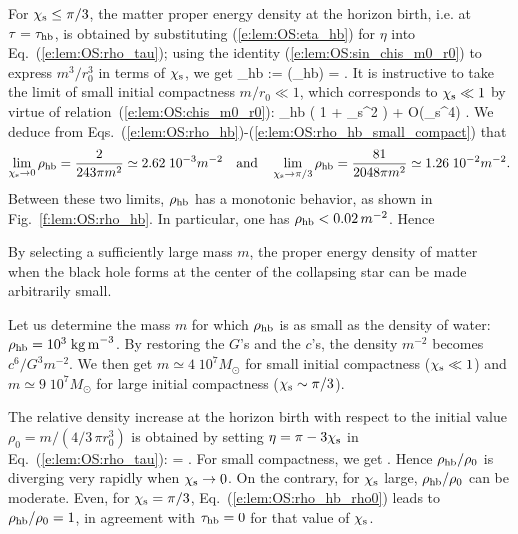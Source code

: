For $\chi_{\rm s} \leq \pi/3$, the matter proper energy density at the horizon birth,
i.e. at $\tau = \tau_{\rm hb}$, is obtained by substituting (\ref{e:lem:OS:eta_hb})
for $\eta$ into Eq.~(\ref{e:lem:OS:rho_tau}); using the identity (\ref{e:lem:OS:sin_chis_m0_r0})
to express $m^3/r_0^3$ in terms of $\chi_{\rm s}$, we get
\be \label{e:lem:OS:rho_hb}
    \rho_{\rm hb} := \rho(\tau_{\rm hb}) =   .
\ee
It is instructive to take the limit of small initial compactness $m/r_0 \ll 1$,
which corresponds to $\chi_{\rm s} \ll 1$ by virtue of relation~(\ref{e:lem:OS:chis_m0_r0}):
\be \label{e:lem:OS:rho_hb_small_compact}
    \rho_{\rm hb}\simeq {} \left( 1 +  \chi_{\rm s}^2 \right)
    + O(\chi_{\rm s}^4) .
\ee
We deduce from Eqs.~(\ref{e:lem:OS:rho_hb})-(\ref{e:lem:OS:rho_hb_small_compact}) that
\[
    \lim_{\chi_{\rm s}\to 0} \rho_{\rm hb} = \frac{2}{243\pi m^2}
    \simeq 2.62\; 10^{-3} m^{-2}
    \quad\mbox{and}\quad
    \lim_{\chi_{\rm s}\to \pi/3}  \rho_{\rm hb} = \frac{81}{2048\pi m^2}
    \simeq 1.26\; 10^{-2}  m^{-2}.
\]
Between these two limits, $\rho_{\rm hb}$ has a monotonic behavior, as shown in
Fig.~\ref{f:lem:OS:rho_hb}. In particular, one has
$\rho_{\rm hb} < 0.02 \, m^{-2}$.
Hence
\begin{prop}
By selecting a sufficiently large mass $m$, the proper energy density
of matter when the black hole forms at the center of the collapsing star
can be made arbitrarily small.
\end{prop}
\begin{example} \label{x:lem:OS:rho_hb_water}
Let us determine the mass $m$ for which  $\rho_{\rm hb}$ is as small as
the density of water: $\rho_{\rm hb} = 10^3 \; {\rm kg\, m}^{-3}$.
By restoring the $G$'s and the $c$'s, the density $m^{-2}$ becomes
$c^6/G^3 m^{-2}$.  We then get $m \simeq 4\; 10^7 M_\odot$ for small initial compactness
($\chi_{\rm s} \ll 1$)
and $m \simeq 9\; 10^7 M_\odot$ for large initial compactness
($\chi_{\rm s} \sim \pi/3$).
\end{example}

The relative density increase at the horizon birth with respect to the initial
value $\rho_0 = m/(4/3 \,\pi r_0^3)$ is obtained by setting $\eta = \pi - 3 \chi_{\rm s}$
in Eq.~(\ref{e:lem:OS:rho_tau}):
\be \label{e:lem:OS:rho_hb_rho0}
     =  .
\ee
For small compactness, we get
\be \label{e:lem:OS:rho_hb_rho0_small_chis}
       .
\ee
Hence $\rho_{\rm hb}/\rho_0$ is diverging very rapidly when $\chi_{\rm s}\to 0$.
On the contrary, for $\chi_{\rm s}$ large, $\rho_{\rm hb}/\rho_0$ can be moderate.
Even, for $\chi_{\rm s} = \pi/3$, Eq.~(\ref{e:lem:OS:rho_hb_rho0})
leads to $\rho_{\rm hb}/\rho_0 = 1$, in
agreement with $\tau_{\rm hb} = 0$ for that value of $\chi_{\rm s}$.

